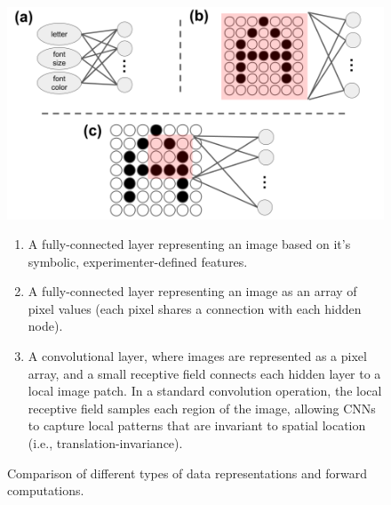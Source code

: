 \documentclass[12pt]{article}
\begin{document}
\begin{figure}[!h]
    \centering
    \includegraphics[scale=.4]{figures/forwardOperations.png}
    \caption{Comparison of different types of data representations and forward computations. }
        \begin{enumerate}[label=(\alph*)]
            \item A fully-connected layer representing an image based on it's symbolic, experimenter-defined features. 
            \item A fully-connected layer representing an image as an array of pixel values (each pixel shares a connection with each hidden node). 
            \item A convolutional layer, where images are represented as a pixel array, and a small receptive field connects each hidden layer to a local image patch. In a standard convolution operation, the local receptive field samples each region of the image, allowing CNNs to capture local patterns that are invariant to spatial location (i.e., translation-invariance).
        \end{enumerate}
    \label{fig:forwardOperations}
\end{figure} 
\end{document}
